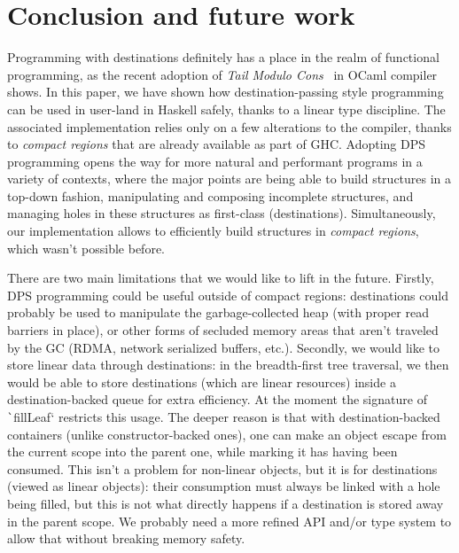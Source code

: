 \documentclass[english]{jflart}
\begin{document}
\section{Conclusion and future work}

Programming with destinations definitely has a place in the realm of functional programming, as the recent adoption of \emph{Tail Modulo Cons}~\cite{bour_tmc_2021} in OCaml compiler shows. In this paper, we have shown how destination-passing style programming can be used in user-land in Haskell safely, thanks to a linear type discipline. The associated implementation relies only on a few alterations to the compiler, thanks to \emph{compact regions} that are already available as part of GHC. Adopting DPS programming opens the way for more natural and performant programs in a variety of contexts, where the major points are being able to build structures in a top-down fashion, manipulating and composing incomplete structures, and managing holes in these structures as first-class (destinations). Simultaneously, our implementation allows to efficiently build structures in \emph{compact regions}, which wasn't possible before.

There are two main limitations that we would like to lift in the future. Firstly, DPS programming could be useful outside of compact regions: destinations could probably be used to manipulate the garbage-collected heap (with proper read barriers in place), or other forms of secluded memory areas that aren't traveled by the GC (RDMA, network serialized buffers, etc.). Secondly, we would like to store linear data through destinations: in the breadth-first tree traversal, we then would be able to store destinations (which are linear resources) inside a destination-backed queue for extra efficiency. At the moment the signature of \texttt`fillLeaf` restricts this usage. The deeper reason is that with destination-backed containers (unlike constructor-backed ones), one can make an object escape from the current scope into the parent one, while marking it has having been consumed. This isn't a problem for non-linear objects, but it is for destinations (viewed as linear objects): their consumption must always be linked with a hole being filled, but this is not what directly happens if a destination is stored away in the parent scope. We probably need a more refined API and/or type system to allow that without breaking memory safety.

\printbibliography
\end{document}
